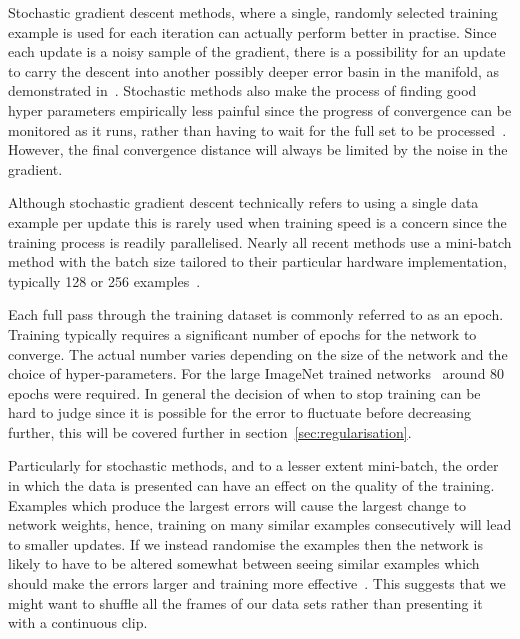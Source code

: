 \documentclass[11pt]{article} %
\begin{document}
Stochastic gradient descent methods, where a single, randomly selected training example is used for each iteration can actually perform better in practise. Since each update is a noisy sample of the gradient, there is a possibility for an update to carry the descent into another possibly deeper error basin in the manifold, as demonstrated in~\cite{Heskes1993}. Stochastic methods also make the process of finding good hyper parameters empirically less painful since the progress of convergence can be monitored as it runs, rather than having to wait for the full set to be processed~\cite{LeCun1998a}. However, the final convergence distance will always be limited by the noise in the gradient.

Although stochastic gradient descent technically refers to using a single data example per update this is rarely used when training speed is a concern since the training process is readily parallelised. Nearly all recent methods use a mini-batch method with the batch size tailored to their particular hardware implementation, typically 128 or 256 examples~\cite{Simonyan2015,Krizhevsky2012,Toshev,Sermanet2013b}.

Each full pass through the training dataset is commonly referred to as an epoch. Training typically requires a significant number of epochs for the network to converge. The actual number varies depending on the size of the network and the choice of hyper-parameters. For the large ImageNet trained networks~\cite{Simonyan2015,Krizhevsky2012,Zeiler2014} around 80 epochs were required. In general the decision of when to stop training can be hard to judge since it is possible for the error to fluctuate before decreasing further, this will be covered further in section~\ref{sec:regularisation}.

Particularly for stochastic methods, and to a lesser extent mini-batch, the order in which the data is presented can have an effect on the quality of the training. Examples which produce the largest errors will cause the largest change to network weights, hence, training on many similar examples consecutively will lead to smaller updates. If we instead randomise the examples then the network is likely to have to be altered somewhat between seeing similar examples which should make the errors larger and training more effective~\cite{LeCun1998a}. This suggests that we might want to shuffle all the frames of our data sets rather than presenting it with a continuous clip. 
\end{document}
